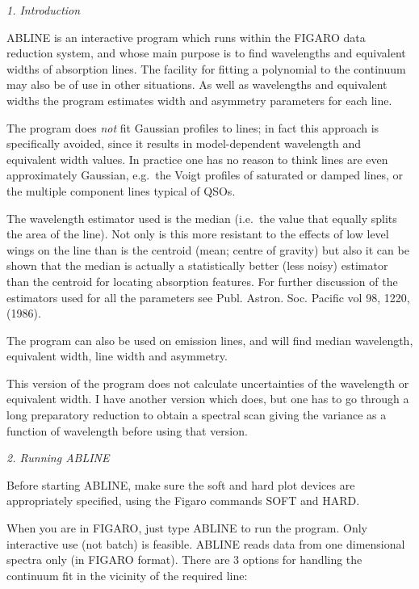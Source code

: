 \vspace{12pt}
{\it 1. Introduction}

ABLINE is an interactive program which runs within the FIGARO data 
reduction system, and whose main purpose is to find wavelengths and 
equivalent widths of absorption lines. The facility for fitting a 
polynomial to the continuum may also be of use in other situations. As well 
as wavelengths and equivalent widths the program estimates width 
and asymmetry parameters for each line. 

The program does {\it not} fit Gaussian profiles to lines; in fact this 
approach is specifically avoided, since it results in model-dependent 
wavelength and equivalent width values. In practice one has no reason to 
think lines are even approximately Gaussian, e.g.\ the Voigt profiles of 
saturated or damped lines, or the multiple component lines typical of QSOs.

The wavelength estimator used is the median (i.e.\ the value that equally 
splits the area of the line). Not only is this more resistant to the 
effects of low level wings on the line than is the centroid (mean; centre of 
gravity) but also it can be shown that the median is actually a 
statistically better (less noisy) estimator than the centroid for locating 
absorption features.  For further discussion of the estimators used for all
the parameters see Publ. Astron. Soc. Pacific vol 98, 1220, (1986).

The program can also be used on emission lines, and will find median 
wavelength, equivalent width, line width and asymmetry.

This version of the program does not calculate uncertainties of the 
wavelength or equivalent width. I have another version which does, but one 
has to go through a long preparatory reduction to obtain a spectral scan 
giving the variance as a function of wavelength before using that version.


\goodbreak
\vspace{12pt}
{\it 2. Running ABLINE}

Before starting ABLINE, make sure the soft and hard plot devices are 
appropriately specified, using the Figaro commands SOFT and HARD.

When you are in FIGARO, just type ABLINE to run the program. Only
interactive use (not batch) is feasible.
ABLINE reads data from one dimensional spectra only (in 
FIGARO format). There are 3 options for handling the 
continuum fit in the vicinity of the required line:

